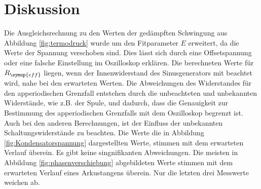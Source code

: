 \section{Diskussion}
\label{sec:Diskussion}
Die Ausgleichsrechnung zu den Werten der gedämpften Schwingung aus Abbildung
\ref{fig:termodruck} wurde um den Fitparameter $E$ erweitert, da die Werte
der Spannung verschoben sind. Dies lässt sich durch eine Offsetspannung oder
eine falsche Einstellung im Oszilloskop erklären.
Die berechneten Werte für $R_{\symup{eff}}$ liegen, wenn der Innenwiderstand des
Sinusgenerators mit beachtet wird, nahe bei den erwarteten Werten. Die
Abweichungen des Widerstandes für den apperiodischen Grenzfall entstehen
 durch die unbeachteten und unbekannten Widerstände, wie z.B.
der Spule, und dadurch, dass die Genauigkeit zur Bestimmung des apperiodischen
Grenzfalls mit dem Oszilloskop begrenzt ist.
Auch bei den anderen Berechnungen, ist der Einfluss der unbekannten
Schaltungswiderstände zu beachten. 
Die Werte die in Abbildung \ref{fig:Kondensatorspannung} dargestellten Werte,
stimmen mit dem erwarteten Verlauf überein. Es gibt keine singnifikanten
Abweichungen.
Die meisten in Abbildung \ref{fig:phasenverschiebung} abgebildeten Werte stimmen mit dem
erwarteten Verlauf eines Arkustangens überein. Nur die letzten drei Messwerte
weichen ab.
